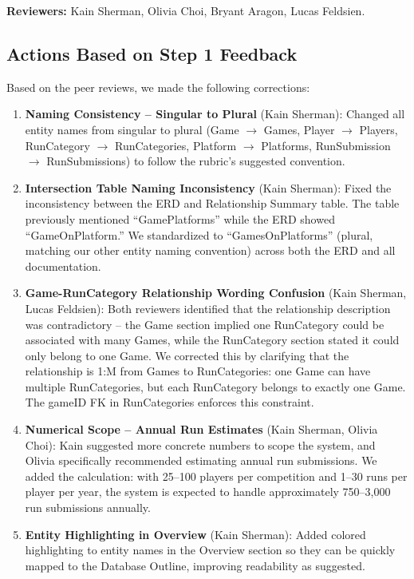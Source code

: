\documentclass[11pt]{article}
\begin{document}
\textbf{Reviewers:} Kain Sherman, Olivia Choi, Bryant Aragon, Lucas Feldsien.

\subsection*{Actions Based on Step 1 Feedback}

Based on the peer reviews, we made the following corrections:

\begin{enumerate}[leftmargin=2em]
    \item \textbf{Naming Consistency -- Singular to Plural} (Kain Sherman): Changed all entity names from singular to plural (Game $\rightarrow$ Games, Player $\rightarrow$ Players, RunCategory $\rightarrow$ RunCategories, Platform $\rightarrow$ Platforms, RunSubmission $\rightarrow$ RunSubmissions) to follow the rubric's suggested convention.

    \item \textbf{Intersection Table Naming Inconsistency} (Kain Sherman): Fixed the inconsistency between the ERD and Relationship Summary table. The table previously mentioned ``GamePlatforms'' while the ERD showed ``GameOnPlatform.'' We standardized to ``GamesOnPlatforms'' (plural, matching our other entity naming convention) across both the ERD and all documentation.

    \item \textbf{Game-RunCategory Relationship Wording Confusion} (Kain Sherman, Lucas Feldsien): Both reviewers identified that the relationship description was contradictory -- the Game section implied one RunCategory could be associated with many Games, while the RunCategory section stated it could only belong to one Game. We corrected this by clarifying that the relationship is 1:M from Games to RunCategories: one Game can have multiple RunCategories, but each RunCategory belongs to exactly one Game. The gameID FK in RunCategories enforces this constraint.

    \item \textbf{Numerical Scope -- Annual Run Estimates} (Kain Sherman, Olivia Choi): Kain suggested more concrete numbers to scope the system, and Olivia specifically recommended estimating annual run submissions. We added the calculation: with 25--100 players per competition and 1--30 runs per player per year, the system is expected to handle approximately 750--3,000 run submissions annually.

    \item \textbf{Entity Highlighting in Overview} (Kain Sherman): Added colored highlighting to entity names in the Overview section so they can be quickly mapped to the Database Outline, improving readability as suggested.


\end{enumerate}
\end{document}
